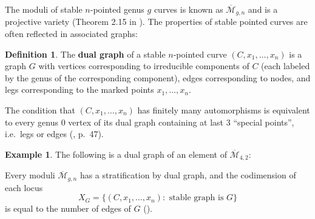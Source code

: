 \documentclass[thesis]{thesis-umich}           %
\theoremstyle{definition}
\newtheorem{dfn}[thm]{Definition}
\newtheorem{eg}[thm]{Example}
\begin{document}
The moduli of stable $n$-pointed genus $g$ curves is known as $\overline{\mathcal M}_{g,n}$ and is a projective variety (Theorem 2.15 in \cite{Moduli}).
The properties of stable pointed curves are often reflected in associated graphs:

\begin{dfn}
  The {\bf dual graph} of a stable $n$-pointed curve $(C,x_1,\dots,x_n)$
  is a graph $G$ with vertices corresponding to irreducible components
  of $C$ (each labeled by the genus of
  the corresponding component), edges corresponding to nodes, and
  legs corresponding to the marked points $x_1,\dots,x_n$.
\end{dfn}

The condition that $(C,x_1,\dots,x_n)$ has finitely many
automorphisms is equivalent to every genus $0$ vertex of its dual graph
containing at last 3 ``special points'', i.e.\ legs or edges (\cite{Moduli}, p.\ 47).

\begin{eg}
  The following is a dual graph of an element of $\overline{\mathcal M}_{4,2}$:


    Every moduli $\overline{\mathcal M}_{g,n}$ has a stratification
    by dual graph, and the codimension of each locus
    \[
    X_G=\{(C,x_1,\dots,x_n):\text{ stable graph is }G\}
    \]
    is equal to the number of edges of $G$ (\cite{Vakil}).
  
  \end{eg}
\end{document}
